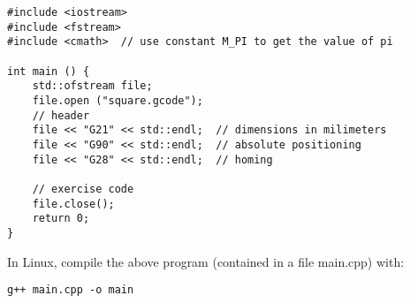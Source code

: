 \documentclass{article}
\begin{document}
\begin{verbatim}
#include <iostream>
#include <fstream>
#include <cmath>  // use constant M_PI to get the value of pi

int main () {
    std::ofstream file;
    file.open ("square.gcode");
    // header
    file << "G21" << std::endl;  // dimensions in milimeters
    file << "G90" << std::endl;  // absolute positioning
    file << "G28" << std::endl;  // homing

    // exercise code
    file.close();
    return 0;
}

\end{verbatim}

In Linux, compile the above program (contained in a file main.cpp) with:

\begin{verbatim}
g++ main.cpp -o main
\end{verbatim}
\end{document}
